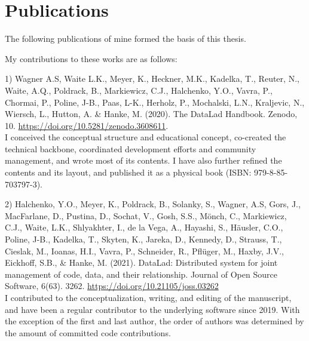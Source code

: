 
\chapter{Publications}

The following publications of mine formed the basis of this thesis.



\begin{refsection}
\nocite{Halchenko2021, wagner2020datalad, wagner2022fairly}
\begin{refcontext}[sorting=nyt]  
	\printbibliography[heading=none, resetnumbers=true]
\end{refcontext}

My contributions to these works are as follows:


1) Wagner A.S, Waite L.K., Meyer, K., Heckner, M.K., Kadelka, T., Reuter, N., Waite, A.Q.,  Poldrack, B., Markiewicz, C.J.,  Halchenko, Y.O., Vavra, P., Chormai, P., Poline, J-B., Paas, L-K., Herholz, P., Mochalski, L.N., Kraljevic, N., Wiersch, L., Hutton, A. \& Hanke, M. (2020). The DataLad Handbook. Zenodo, 10. \url{https://doi.org/10.5281/zenodo.3608611}.\\
\forceindent I conceived the conceptual structure and educational concept, co-created the technical backbone, coordinated development efforts and community management, and wrote most of its contents.
I have also further refined the contents and its layout, and published it as a physical book (ISBN: 979-8-85-703797-3).

2) Halchenko, Y.O., Meyer, K., Poldrack, B., Solanky, S., Wagner, A.S, Gors, J., MacFarlane, D., Pustina, D., Sochat, V., Gosh, S.S., Mönch, C., Markiewicz, C.J., Waite, L.K., Shlyakhter, I., de la Vega, A., Hayashi, S., Häusler, C.O., Poline, J-B., Kadelka, T., Skyten, K., Jareka, D., Kennedy, D., Strauss, T., Cieslak, M., Ioanas, H.I., Vavra, P., Schneider, R., Pflüger, M., Haxby, J.V., Eickhoff, S.B., \& Hanke, M. (2021). DataLad: Distributed system for joint management of code, data, and their relationship. Journal of Open Source Software, 6(63). 3262. \url{https://doi.org/10.21105/joss.03262} \\
\forceindent I contributed to the conceptualization, writing, and editing of the manuscript, and have been a regular contributor to the underlying software since 2019. With the exception of the first and last author, the order of authors was determined by the amount of committed code contributions.


\end{refsection}
